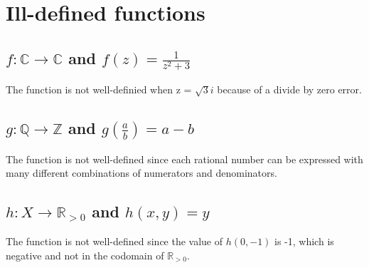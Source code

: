 \section{Ill-defined functions}
\subsection{$f: \mathbb{C} \rightarrow \mathbb{C}$ and $f(z) = \frac{1}{z^2+3}$}
The function is not well-definied when z = $\sqrt{3}i$ because of a divide by zero error.

\subsection{$g: \mathbb{Q} \rightarrow \mathbb{Z}$ and $g(\frac{a}{b}) = a-b$}
The function is not well-defined since each rational number can be expressed with many different combinations of numerators and denominators.

\subsection{$h: X \rightarrow \mathbb{R}_{>0}$ and $h(x, y) = y$}
The function is not well-defined since the value of $h(0, -1)$ is -1, which is negative and not in the codomain of $\mathbb{R}_{>0}$.